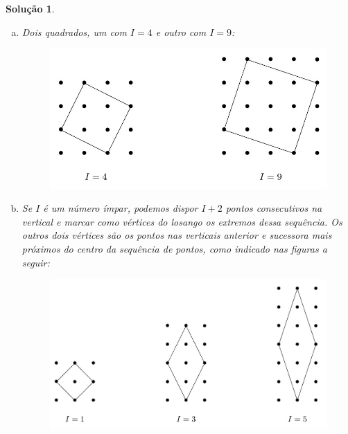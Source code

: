 \documentclass{hipatia}
\newtheorem*{solution*}{Solução}
\begin{document}
\begin{solution*}
\begin{enumerate}[a)]




\item Dois quadrados, um com $I=4$ e outro com $I=9$:

\begin{figure}[htbp]
	\centering
		\includegraphics[scale=0.6]{F54.png}
\end{figure} 





\item Se $I$ é um número ímpar, podemos dispor $I+2$ pontos consecutivos na vertical e marcar como vértices do losango os extremos dessa sequência. Os outros dois vértices são os pontos nas verticais anterior e sucessora mais próximos do centro da sequência de pontos, como indicado nas figuras a seguir: 

\begin{figure}[htbp]
	\centering
		\includegraphics[scale=0.4]{F56.png}
\end{figure} 


\end{enumerate}
\end{solution*}
\end{document}
